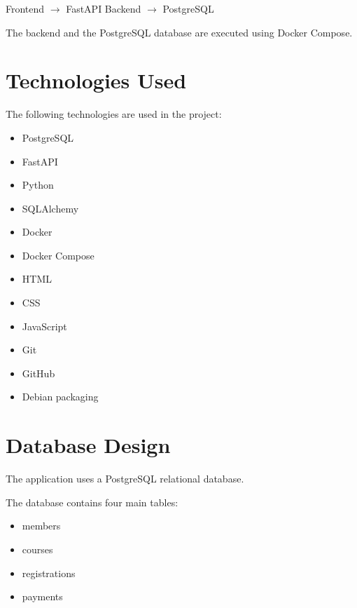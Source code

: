 \documentclass[12pt,a4paper]{article}
\begin{document}
\begin{center}
Frontend $\rightarrow$ FastAPI Backend $\rightarrow$ PostgreSQL
\end{center}

The backend and the PostgreSQL database are executed using
Docker Compose.


\section{Technologies Used}

The following technologies are used in the project:

\begin{itemize}
    \item PostgreSQL
    \item FastAPI
    \item Python
    \item SQLAlchemy
    \item Docker
    \item Docker Compose
    \item HTML
    \item CSS
    \item JavaScript
    \item Git
    \item GitHub
    \item Debian packaging
\end{itemize}



\section{Database Design}

The application uses a PostgreSQL relational database.

The database contains four main tables:

\begin{itemize}
    \item members
    \item courses
    \item registrations
    \item payments
\end{itemize}
\end{document}
